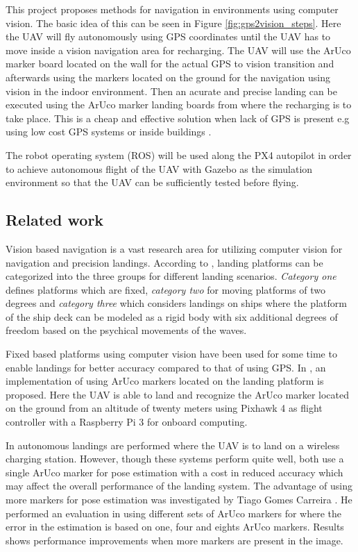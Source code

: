 \documentclass[../Head/report.tex]{subfiles}
\begin{document}
This project proposes methods for navigation in environments using computer vision. The basic idea of this can be seen in Figure \ref{fig:gps2vision_steps}. Here the UAV will fly autonomously using GPS coordinates until the UAV has to move inside a vision navigation area for recharging. The UAV will use the ArUco marker board located on the wall for the actual GPS to vision transition and afterwards using the markers located on the ground for the navigation using vision in the indoor environment. Then an acurate and precise landing can be executed using the ArUco marker landing boards from where the recharging is to take place. This is a cheap and effective solution when lack of GPS is present e.g using low cost GPS systems or inside buildings \cite{Visual-Inertial-Navigation}. 

The robot operating system (ROS) will be used along the PX4 autopilot in order to achieve autonomous flight of the UAV with Gazebo as the simulation environment so that the UAV can be sufficiently tested before flying. 

\subsection{Related work}
\label{sec:related_work}

Vision based navigation is a vast research area for utilizing computer vision for navigation and precision landings. According to \cite{OnBoardVisionAutonomousLanding}, landing platforms can be categorized into the three groups for different landing scenarios. \textit{Category one} defines platforms which are fixed, \textit{category two} for moving platforms of two degrees and \textit{category three} which considers landings on ships where the platform of the ship deck can be modeled as a rigid body with six additional degrees of freedom based on the psychical movements of the waves. 

Fixed based platforms using computer vision have been used for some time to enable landings for better accuracy compared to that of using GPS. In \cite{AVisionBasedSystemForAutonomousVerticaLanding}, an implementation of using ArUco markers located on the landing platform is proposed. Here the UAV is able to land and recognize the ArUco marker located on the ground from an altitude of twenty meters using Pixhawk 4 as flight controller with a Raspberry Pi 3 for onboard computing. 

In \cite{AutonomousRechargingSystemforDronesOne} \cite{AutonomousRechargingSystemforDronesTwo} autonomous landings are performed where the UAV is to land on a wireless charging station. However, though these systems perform quite well, both use a single ArUco marker for pose estimation with a cost in reduced accuracy which may affect the overall performance of the landing system. The advantage of using more markers for pose estimation was investigated by Tiago Gomes Carreira \cite{QuadcopterAutomaticLandingOnaDockingStation}. He performed an evaluation in using different sets of ArUco markers for where the error in the estimation is based on one, four and eights ArUco markers. Results shows performance improvements when more markers are present in the image. 
\end{document}
